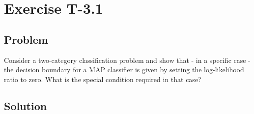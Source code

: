 \section*{Exercise T-3.1}
\subsection*{Problem}
Consider a two-category classification problem and show that - in a
specific case - the decision boundary for a MAP classifier is given by
setting the log-likelihood ratio to zero. What is the special condition
required in that case?

\subsection*{Solution}